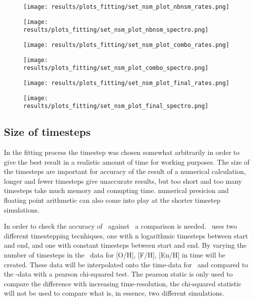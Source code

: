 \begin{figure}[h]
  \centering
  \texttt{[image: results/plots\_fitting/set\_nsm\_plot\_nbnsm\_rates.png]}
  \caption{\label{fig:fit-v3-number-nsmr}}
\end{figure}
\begin{figure}[h]
  \centering
  \texttt{[image: results/plots\_fitting/set\_nsm\_plot\_nbnsm\_spectro.png]}
  \caption{\label{fig:fit-v3-number-euro}}
\end{figure}
\begin{figure}[h]
  \centering
  \texttt{[image: results/plots\_fitting/set\_nsm\_plot\_combo\_rates.png]}
  \caption{\label{fig:fit-v3-combo-nsmr}}
\end{figure}
\begin{figure}[h]
  \centering
  \texttt{[image: results/plots\_fitting/set\_nsm\_plot\_combo\_spectro.png]}
  \caption{\label{fig:fit-v3-combo-euro}}
\end{figure}
\begin{figure}[h]
  \centering
  \texttt{[image: results/plots\_fitting/set\_nsm\_plot\_final\_rates.png]}
  \caption{\label{fig:fit-v3-nsmr}}
\end{figure}
\begin{figure}[h]
  \centering
  \texttt{[image: results/plots\_fitting/set\_nsm\_plot\_final\_spectro.png]}
  \caption{\label{fig:fit-v3-final-euro}}
\end{figure}
\FloatBarrier

\subsection{Size of timesteps}
In the fitting process the timestep was chosen somewhat arbitrarily in order to give the best result in a realistic amount of time for working purposes. The size of the timesteps are important for accuracy of the result of a numerical calculation, longer and fewer timesteps give unaccurate results, but too short and too many timesteps take much memory and comupting time. numerical presicion and floating point arithmetic can also come into play at the shorter timestep simulations.

In order to check the accuracy of \omegamodel\ against \eris\ a comparison is needed.
\omegamodel\ uses two different timestepping tecnhiques, one with n logarithmic timesteps between start and end, and one with constant timesteps between start and end.
By varying the number of timesteps in the \omegamodel\ data for [O/H], [F/H], [Eu/H] in time will be created.
These data will be interpolated onto the time-data for \eris\ and compared to the \eris-data with a pearson chi-squared test. The pearson static is only used to compare the difference with increasing time-resolution, the chi-squared statistic will not be used to compare what is, in essence, two different simulations.

